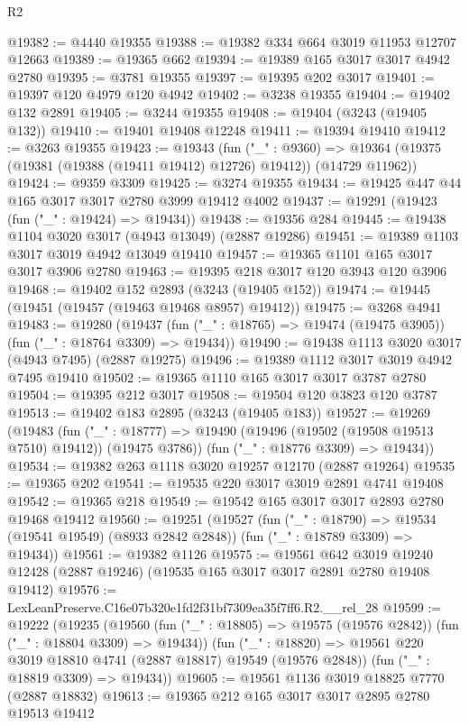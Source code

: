 \begin{lexlean}{R2}
\begin{coremodule}
@19382 := @4440 @19355
@19388 := @19382 @334 @664 @3019 @11953 @12707 @12663
@19389 := @19365 @662
@19394 := @19389 @165 @3017 @3017 @4942 @2780
@19395 := @3781 @19355
@19397 := @19395 @202 @3017
@19401 := @19397 @120 @4979 @120 @4942
@19402 := @3238 @19355
@19404 := @19402 @132 @2891
@19405 := @3244 @19355
@19408 := @19404 (@3243 (@19405 @132))
@19410 := @19401 @19408 @12248
@19411 := @19394 @19410
@19412 := @3263 @19355
@19423 := @19343
    (fun ("_" : @9360) =>
    @19364 (@19375 (@19381 (@19388 (@19411 @19412) @12726) @19412)) (@14729 @11962))
@19424 := @9359 @3309
@19425 := @3274 @19355
@19434 := @19425 @447 @44 @165 @3017 @3017 @2780 @3999 @19412 @4002
@19437 := @19291 (@19423 (fun ("_" : @19424) => @19434))
@19438 := @19356 @284
@19445 := @19438 @1104 @3020 @3017 (@4943 @13049) (@2887 @19286)
@19451 := @19389 @1103 @3017 @3019 @4942 @13049 @19410
@19457 := @19365 @1101 @165 @3017 @3017 @3906 @2780
@19463 := @19395 @218 @3017 @120 @3943 @120 @3906
@19468 := @19402 @152 @2893 (@3243 (@19405 @152))
@19474 := @19445 (@19451 (@19457 (@19463 @19468 @8957) @19412))
@19475 := @3268 @4941
@19483 := @19280
    (@19437 (fun ("_" : @18765) => @19474 (@19475 @3905)) (fun ("_" : @18764 @3309) => @19434))
@19490 := @19438 @1113 @3020 @3017 (@4943 @7495) (@2887 @19275)
@19496 := @19389 @1112 @3017 @3019 @4942 @7495 @19410
@19502 := @19365 @1110 @165 @3017 @3017 @3787 @2780
@19504 := @19395 @212 @3017
@19508 := @19504 @120 @3823 @120 @3787
@19513 := @19402 @183 @2895 (@3243 (@19405 @183))
@19527 := @19269
    (@19483
      (fun ("_" : @18777) => @19490 (@19496 (@19502 (@19508 @19513 @7510) @19412)) (@19475 @3786))
      (fun ("_" : @18776 @3309) => @19434))
@19534 := @19382 @263 @1118 @3020 @19257 @12170 (@2887 @19264)
@19535 := @19365 @202
@19541 := @19535 @220 @3017 @3019 @2891 @4741 @19408
@19542 := @19365 @218
@19549 := @19542 @165 @3017 @3017 @2893 @2780 @19468 @19412
@19560 := @19251
    (@19527
      (fun ("_" : @18790) => @19534 (@19541 @19549) (@8933 @2842 @2848))
      (fun ("_" : @18789 @3309) => @19434))
@19561 := @19382 @1126
@19575 := @19561
    @642
    @3019
    @19240
    @12428
    (@2887 @19246)
    (@19535 @165 @3017 @3017 @2891 @2780 @19408 @19412)
@19576 := LexLeanPreserve.C16e07b320e1fd2f31bf7309ea35f7ff6.R2.__rel_28
@19599 := @19222
    (@19235
      (@19560 (fun ("_" : @18805) => @19575 (@19576 @2842)) (fun ("_" : @18804 @3309) => @19434))
      (fun ("_" : @18820) => @19561 @220 @3019 @18810 @4741 (@2887 @18817) @19549 (@19576 @2848))
      (fun ("_" : @18819 @3309) => @19434))
@19605 := @19561 @1136 @3019 @18825 @7770 (@2887 @18832)
@19613 := @19365 @212 @165 @3017 @3017 @2895 @2780 @19513 @19412

\end{coremodule}
\end{lexlean}
